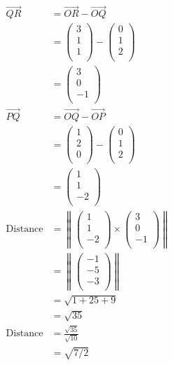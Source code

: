 \documentclass[12pt]{article}
\newenvironment{problem}[2][Problem]{\begin{trivlist}
\item[\hskip \labelsep {\bfseries #1}\hskip \labelsep {\bfseries #2.}]}{\end{trivlist}}
\begin{document}
\begin{problem}{5}
\end{problem}
\begin{align*}
\vec{QR} &= \vec{OR} - \vec{OQ} \\
&= 
\left( \begin{array}{c}
	3\\
	1\\
	1\\
\end{array} \right)
-
\left( \begin{array}{c}
	0\\
	1\\
	2\\
\end{array} \right) \\
&=
\left( \begin{array}{c}
	3\\
	0\\
	-1\\
\end{array} \right) \\
\vec{PQ} &= \vec{OQ} - \vec{OP} \\
&= 
\left( \begin{array}{c}
	1\\
	2\\
	0\\
\end{array} \right)
-
\left( \begin{array}{c}
	0\\
	1\\
	2\\
\end{array} \right) \\
&=
\left( \begin{array}{c}
	1\\
	1\\
	-2\\
\end{array} \right) \\
\text{Distance} &= 
\left\lVert
\left( \begin{array}{c}
	1\\
	1\\
	-2\\
\end{array} \right)
\times
\left( \begin{array}{c}
	3\\
	0\\
	-1\\
\end{array} \right)
\right\rVert \\
&= 
\left\lVert
\left( \begin{array}{c}
	-1\\
	-5\\
	-3\\
\end{array} \right)
\right\rVert \\
&= \sqrt{1 + 25 + 9} \\
&= \sqrt{35} \\
\text{Distance} &= \frac{\sqrt{35}}{\sqrt{10}} \\
&= \sqrt{7/2}
\end{align*}
\filbreak
\end{document}
